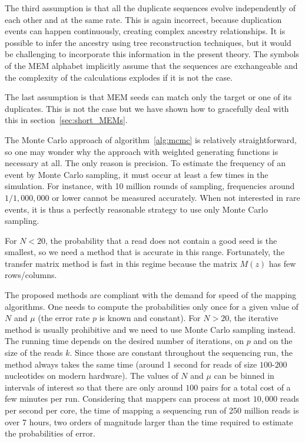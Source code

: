 \documentclass{article}
\begin{document}
The third assumption is that all the duplicate sequences evolve
independently of each other and at the same rate. This is again incorrect,
because duplication events can happen continuously, creating complex
ancestry relationships. It is possible to infer the ancestry using tree
reconstruction techniques, but it would be challenging to incorporate this
information in the present theory. The symbols of the MEM alphabet
implicitly assume that the sequences are exchangeable and the complexity
of the calculations explodes if it is not the case.

The last assumption is that MEM seeds can match only the target or one of
its duplicates. This is not the case but we have shown how to gracefully
deal with this in section~\ref{sec:short_MEMs}.

The Monte Carlo approach of algorithm~\ref{alg:mcmc} is relatively
straightforward, so one may wonder why the approach with weighted
generating functions is necessary at all. The only reason is precision. To
estimate the frequency of an event by Monte Carlo sampling, it must occur
at least a few times in the simulation. For instance, with 10 million
rounds of sampling, frequencies around $1/1,000,000$ or lower cannot be
measured accurately. When not interested in rare events, it is thus a
perfectly reasonable strategy to use only Monte Carlo sampling.

For $N < 20$, the probability that a read does not contain a good seed is
the smallest, so we need a method that is accurate in this range.
Fortunately, the transfer matrix method is fast in this regime because the
matrix $M(z)$ has few rows/columns.


The proposed methods are compliant with the demand for speed of the
mapping algorithms. One needs to compute the probabilities only once for a
given value of $N$ and $\mu$ (the error rate $p$ is known and constant).
For $N > 20$, the iterative method is usually prohibitive and we need to
use Monte Carlo sampling instead. The running time depends on the desired
number of iterations, on $p$ and on the size of the reads $k$. Since those
are constant throughout the sequencing run, the method always takes the
same time (around 1 second for reads of size $100$-$200$ nucleotides on
modern hardware). The values of $N$ and $\mu$ can be binned in intervals
of interest so that there are only around $100$ pairs for a total cost of
a few minutes per run. Considering that mappers can process at most
$10,000$ reads per second per core, the time of mapping a sequencing run
of 250 million reads is over 7 hours, two orders of magnitude larger than
the time required to estimate the probabilities of error.
\end{document}
